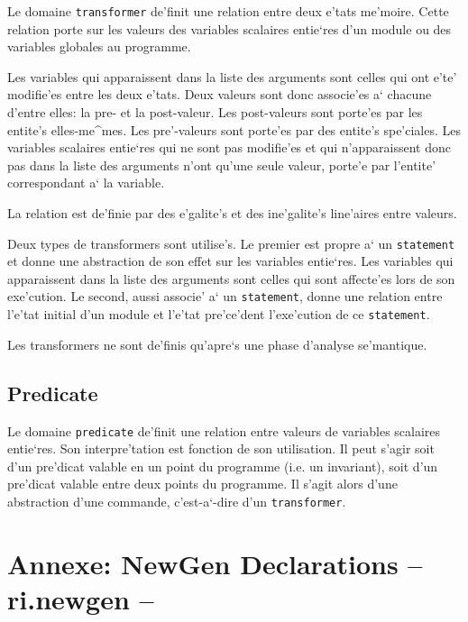 {}

Le domaine {\tt transformer} de'finit une relation entre deux e'tats
me'moire. Cette relation
porte sur les valeurs des variables scalaires entie`res d'un module ou
des variables globales au programme.

Les variables qui apparaissent dans la liste des arguments sont celles
qui ont e'te' modifie'es entre les deux e'tats. Deux valeurs
sont donc associe'es a` chacune d'entre elles: la pre- et la
post-valeur.  Les post-valeurs sont porte'es par les entite's
elles-me^mes. Les pre'-valeurs sont porte'es par des entite's
spe'ciales. Les variables scalaires entie`res qui ne sont pas modifie'es
et qui n'apparaissent donc pas dans la liste des arguments n'ont qu'une
seule valeur, porte'e par l'entite' correspondant a` la variable.

La relation est de'finie par des e'galite's et des ine'galite's
line'aires entre valeurs.

Deux types de transformers sont utilise's. Le premier est propre a` un
{\tt statement} et donne une abstraction de son effet sur les variables
entie`res. Les variables qui apparaissent dans la liste des arguments
sont celles qui sont affecte'es lors de son exe'cution.  Le second,
aussi associe' a` un {\tt statement}, donne une relation entre l'e'tat
initial d'un module et l'e'tat pre'ce'dent l'exe'cution de ce {\tt statement}.

Les transformers ne sont de'finis qu'apre`s une phase d'analyse se'mantique.

\subsection{Predicate}
\label{subsection-predicate}

{}

Le domaine {\tt predicate} de'finit une relation entre valeurs de
variables scalaires entie`res. Son interpre'tation est fonction de
son utilisation. Il peut s'agir soit d'un pre'dicat valable en
un point du programme (i.e. un invariant), soit d'un pre'dicat
valable entre deux points du programme. Il s'agit alors d'une
abstraction d'une commande, c'est-a`-dire d'un {\tt transformer}.

\newpage

\section*{Annexe: NewGen Declarations -- ri.newgen --}

